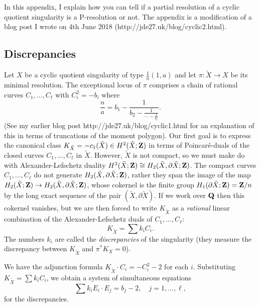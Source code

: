 \documentclass{article}
\begin{document}
In this appendix, I explain how you can tell if a partial resolution
of a cyclic quotient singularity is a P-resolution or not. The
appendix is a modification of a blog post I wrote on 4th June 2018
(http://jde27.uk/blog/cyclic2.html).


\subsection{Discrepancies}


Let \(X\) be a cyclic quotient singularity of type
\(\frac{1}{n}(1,a)\) and let \(\pi\colon\tilde{X}\to X\) be its
minimal resolution. The exceptional locus of \(\pi\) comprises a chain
of rational curves \(C_1,\ldots,C_\ell\) with \(C_i^2=-b_i\) where
\[\frac{n}{a}=b_1-\frac{1}{b_2-\frac{1}{\cdots-\frac{1}{b_\ell}}}.\]
(See my earlier blog post http://jde27.uk/blog/cyclic1.html for an
explanation of this in terms of truncations of the moment
polygon). Our first goal is to express the canonical class
\(K_{\tilde{X}}=-c_1(\tilde{X})\in H^2(\tilde{X};\mathbf{Z})\) in terms of
Poincar\'{e}-duals of the closed curves \(C_1,\ldots,C_\ell\) in
\(\tilde{X}\). However, \(\tilde{X}\) is not compact, so we must make
do with Alexander-Lefschetz duality \(H^2(\tilde{X};\mathbf{Z})\cong
H_2(\tilde{X},\partial\tilde{X};\mathbf{Z})\). The compact curves
\(C_1,\ldots,C_\ell\) do not generate
\(H_2(\tilde{X},\partial\tilde{X};\mathbf{Z})\), rather they span the image
of the map \(H_2(\tilde{X};\mathbf{Z})\to
H_2(\tilde{X},\partial\tilde{X};\mathbf{Z})\), whose cokernel is the finite
group \(H_1(\partial\tilde{X};\mathbf{Z})=\mathbf{Z}/n\) by the long exact sequence
of the pair \((\tilde{X},\partial\tilde{X})\). If we work over \(\mathbf{Q}\)
then this cokernel vanishes, but we are then forced to write
\(K_{\tilde{X}}\) as a {\em rational} linear combination of the
Alexander-Lefschetz duals of \(C_1,\ldots,C_\ell\):
\[K_{\tilde{X}}=\sum k_iC_i.\] The numbers \(k_i\) are called the {\em
discrepancies} of the singularity (they measure the discrepancy
between \(K_{\tilde{X}}\) and \(\pi^*K_X=0\)).


We have the adjunction formula \(K_{\tilde{X}}\cdot C_i=-C_i^2-2\) for
each \(i\). Substituting \(K_{\tilde{X}}=\sum k_iC_i\), we obtain a
system of simultaneous equations \[\sum k_iE_i\cdot E_j=b_j-2,\quad
j=1,\ldots,\ell,\] for the discrepancies.
\end{document}
